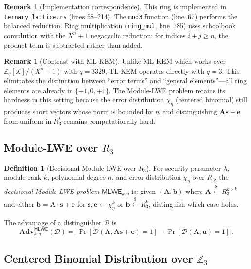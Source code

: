 \documentclass[11pt,a4paper]{article}
\theoremstyle{definition}
\newtheorem{definition}[theorem]{Definition}
\newtheorem{remark}[theorem]{Remark}
\newcommand{\Z}{\mathbb{Z}}
\newcommand{\Rq}{R_3}
\newcommand{\Adv}{\mathbf{Adv}}
\newcommand{\MLWE}{\textsf{MLWE}}
\begin{document}
\begin{remark}[Implementation correspondence]
This ring is implemented in \texttt{ternary\_lattice.rs} (lines 58--214). The \texttt{mod3} function (line~67) performs the balanced reduction. Ring multiplication (\texttt{ring\_mul}, line~185) uses schoolbook convolution with the $X^n+1$ negacyclic reduction: for indices $i+j \geq n$, the product term is subtracted rather than added.
\end{remark}

\begin{remark}[Contrast with ML-KEM]
Unlike ML-KEM which works over $\Z_q[X]/(X^n+1)$ with $q = 3329$, TL-KEM operates directly with $q = 3$. This eliminates the distinction between ``error terms'' and ``general elements''---all ring elements are already in $\{-1,0,+1\}$. The Module-LWE problem retains its hardness in this setting because the error distribution $\chi_\eta$ (centered binomial) still produces short vectors whose norm is bounded by $\eta$, and distinguishing $\mathbf{A}\mathbf{s} + \mathbf{e}$ from uniform in $\Rq^k$ remains computationally hard.
\end{remark}

\subsection{Module-LWE over $\Rq$}

\begin{definition}[Decisional Module-LWE over $\Rq$]
\label{def:mlwe}
For security parameter $\lambda$, module rank $k$, polynomial degree $n$, and error distribution $\chi_\eta$ over $\Rq$, the \emph{decisional Module-LWE problem} $\MLWE_{k,\eta}$ is: given $(\mathbf{A}, \mathbf{b})$ where $\mathbf{A} \xleftarrow{\$} \Rq^{k \times k}$ and either $\mathbf{b} = \mathbf{A} \cdot \mathbf{s} + \mathbf{e}$ for $\mathbf{s}, \mathbf{e} \leftarrow \chi_\eta^k$ or $\mathbf{b} \xleftarrow{\$} \Rq^k$, distinguish which case holds.

The advantage of a distinguisher $\mathcal{D}$ is
\[
  \Adv^{\MLWE}_{k,\eta}(\mathcal{D})
  = \bigl|\Pr[\mathcal{D}(\mathbf{A}, \mathbf{A}\mathbf{s}+\mathbf{e})=1]
    - \Pr[\mathcal{D}(\mathbf{A}, \mathbf{u})=1]\bigr|.
\]
\end{definition}

\subsection{Centered Binomial Distribution over $\Z_3$}
\end{document}
